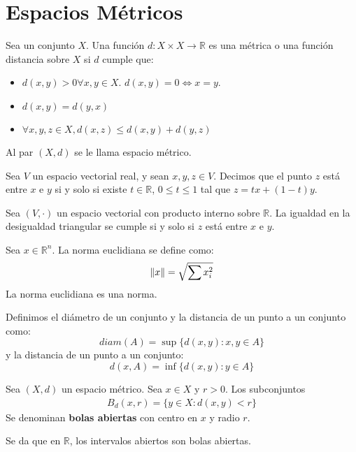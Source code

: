 \documentclass{./Topologia.tex}
\begin{document}
\chapter{Espacios Métricos}
\begin{defin}
Sea un conjunto $X$. Una función $d: X \times X \to \mathbb{R}$ es una métrica o una función distancia sobre $X$ si $d$ cumple que:
\begin{itemize}
	\item $d(x,y) > 0 \forall x,y \in X$. $d(x,y)=0 \iff x=y$.
	\item $d(x,y) = d(y,x)$
	\item $\forall x,y,z \in X, d(x,z) \leq d(x,y) + d(y,z)$ 
\end{itemize}
Al par $(X,d)$ se le llama espacio métrico. 
\end{defin}
\begin{defin} 
	Sea $V$ un espacio vectorial real, y sean $x, y, z \in V$. Decimos que el punto $z$ está entre $x$ e $y$ si y solo si existe $t \in \mathbb{R}$, $0 \leq t \leq 1$ tal que $z = tx +(1-t)y$.     

\end{defin}
\begin{prop}
Sea $(V, \cdot )$ un espacio vectorial con producto interno sobre $\mathbb{R}$. La igualdad en la desigualdad triangular se cumple si y solo si $z$ está entre $x$ e $y$.     
\end{prop}
\begin{prop}
	Sea $x \in \mathbb{R}^{n}$. La norma euclidiana se define como:
	\[
		\norm{x} = \sqrt{\sum x_{i}^{2}}
	\]
	La norma euclidiana es una norma.
\end{prop}
\begin{defin}
Definimos el diámetro de un conjunto y la distancia de un punto a un conjunto como:
\[
	diam(A) = \sup \{ d(x,y): x,y \in A \}
\]
y la distancia de un punto a un conjunto:
\[
	d(x,A) = \inf \{ d(x,y) : y \in A \}
\]
\end{defin}
\begin{defin}
	Sea $(X,d)$ un espacio métrico. Sea $x \in X$ y $r > 0$. Los subconjuntos
	\begin{align}
		B_{d}(x,r) = \{ y \in X : d(x,y) < r \}
	\end{align}
	Se denominan \textbf{bolas abiertas} con centro en $x$ y radio $r$.
\end{defin}
Se da que en $\mathbb{R}$, los intervalos abiertos son bolas abiertas.
\end{document}

